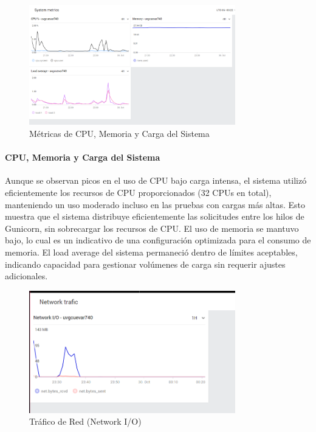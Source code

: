 \begin{figure}[H]
    \centering
    \includegraphics[width=0.8\textwidth]{figuras/SystemMetrics.png}
    \caption{Métricas de CPU, Memoria y Carga del Sistema}
    \label{fig:systemMetrics}
\end{figure}

\paragraph{CPU, Memoria y Carga del Sistema}
Aunque se observan picos en el uso de CPU bajo carga intensa, el sistema utilizó eficientemente los recursos de CPU proporcionados (32 CPUs en total), manteniendo un uso moderado incluso en las pruebas con cargas más altas. Esto muestra que el sistema distribuye eficientemente las solicitudes entre los hilos de Gunicorn, sin sobrecargar los recursos de CPU. El uso de memoria se mantuvo bajo, lo cual es un indicativo de una configuración optimizada para el consumo de memoria. El load average del sistema permaneció dentro de límites aceptables, indicando capacidad para gestionar volúmenes de carga sin requerir ajustes adicionales.

\begin{figure}[H]
    \centering
    \includegraphics[width=0.8\textwidth]{figuras/NetworkTraffic.png}
    \caption{Tráfico de Red (Network I/O)}
    \label{fig:networkTraffic}
\end{figure}

